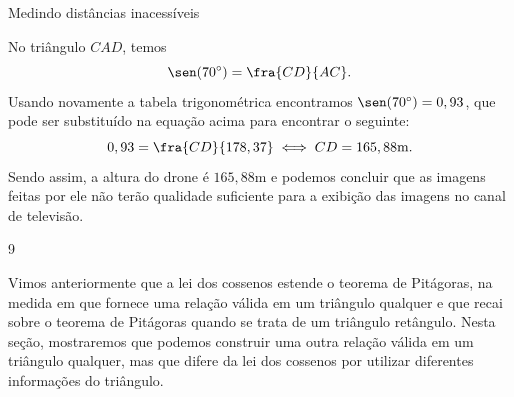 \begin{answer}{Medindo distâncias inacessíveis}
{\begin{enumerate}
No triângulo $CAD$, temos
$$\sen(70^\circ)=\fra{CD}{AC}.$$
Usando novamente a tabela trigonométrica encontramos $\sen(70^\circ)=0,93$, que pode ser substituído na equação acima para encontrar o seguinte:
$$0,93=\fra{CD}{178,37} \iff CD=165,88\text{m}.$$
Sendo assim, a altura do drone é $165,88$m e podemos concluir que as imagens feitas por ele não terão qualidade suficiente para a exibição das imagens no canal de televisão.
\end{enumerate}
}{9}
\end{answer}

\label{exp_outrarelacaonotriangulo}
Vimos anteriormente que a lei dos cossenos estende o teorema de Pitágoras, na medida em que fornece uma relação válida em um triângulo qualquer e que recai sobre o teorema de Pitágoras quando se trata de um triângulo retângulo. Nesta seção, mostraremos que podemos construir uma outra relação válida em um triângulo qualquer, mas que difere da lei dos cossenos por utilizar diferentes informações do triângulo.

